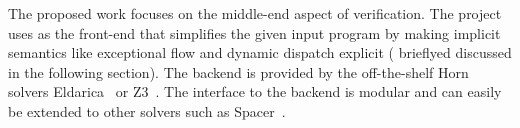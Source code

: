 The proposed work focuses on the middle-end aspect of verification. The project uses \jayhorn
as the front-end that simplifies the given input program
by making implicit semantics like exceptional flow and dynamic dispatch explicit (
brieflyed discussed in the following section). The backend is provided 
by the off-the-shelf Horn solvers Eldarica~\cite{Rummer:2013:DIH:2526861.2526891} 
or Z3~\cite{demoura2008z3}. The interface to the backend is modular and can easily 
be extended to other solvers such as Spacer~\cite{Komuravelli:2014:SMC:2735050.2735053}.




